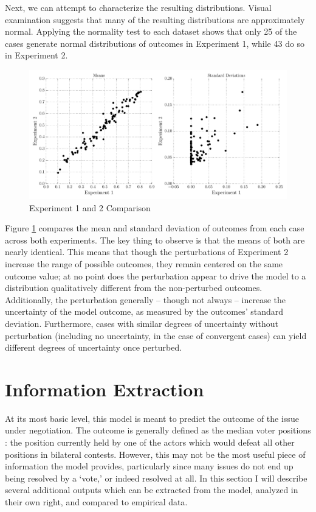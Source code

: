 Next, we can attempt to characterize the resulting distributions. Visual examination suggests that many of the resulting distributions are approximately normal. Applying the \citet{dagostino_1971} normality test to each dataset shows that only 25 of the cases generate normal distributions of outcomes in Experiment 1, while 43 do so in Experiment 2.

\begin{figure}
    \centering
    \includegraphics[width=\textwidth]{BDM_Reproduction/Figures/RandomGamesComparison}

    \caption{Experiment 1 and 2 Comparison}
    \label{fig:random_comparison}
    \figSpace
\end{figure}

Figure \ref{fig:random_comparison} compares the mean and standard deviation of outcomes from each case across both experiments. The key thing to observe is that the means of both are nearly identical. This means that though the perturbations of Experiment 2 increase the range of possible outcomes, they remain centered on the same outcome value; at no point does the perturbation appear to drive the model to a distribution qualitatively different from the non-perturbed outcomes. Additionally, the perturbation generally -- though not always -- increase the uncertainty of the model outcome, as measured by the outcomes' standard deviation. Furthermore, cases with similar degrees of uncertainty without perturbation (including no uncertainty, in the case of convergent cases) can yield different degrees of uncertainty once perturbed. 


\section{Information Extraction} \label{info_extraction}

At its most basic level, this model is meant to predict the outcome of the issue under negotiation. The outcome is generally defined as the median voter positions \citep{black_1948}: the position currently held by one of the actors which would defeat all other positions in bilateral contests. However, this may not be the most useful piece of information the model provides, particularly since many issues do not end up being resolved by a `vote,' or indeed resolved at all. In this section I will describe several additional outputs which can be extracted from the model, analyzed in their own right, and compared to empirical data.

